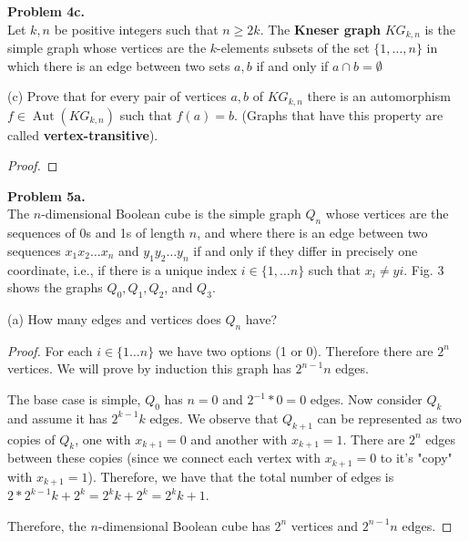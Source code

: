 \documentclass{article}
\newcommand{\set}[1]{\{#1\}}
\DeclareMathOperator*{\Aut}{Aut}
\newenvironment{hwproof}[2]
{
    \textbf{Problem #1.}\\
    #2
    \begin{proof}
}{
    \end{proof}
    \newpage
}
\begin{document}
\begin{hwproof}
    {4c}
    {
        Let $k, n$ be positive integers such that $n \geq 2k$. The \textbf{Kneser graph}
        $KG_{k,n}$ is the simple graph whose vertices are the $k$-elements subsets of
        the set $\set{1,\dots,n}$ in which there is an edge between two sets $a,b$
        if and only if $a\cap b = \emptyset$

        (c) Prove that for every pair of vertices $a,b$ of $KG_{k,n}$ there is an automorphism
        $f \in \Aut(KG_{k,n})$ such that $f(a) = b$. (Graphs that have this property are
        called \textbf{vertex-transitive}).
    }


\end{hwproof}

\begin{hwproof}
    {5a}
    {
        The $n$-dimensional Boolean cube is the simple graph $Q_n$ whose vertices are the
        sequences of 0s and 1s of length $n$, and where there is an edge between two sequences
        $x_1x_2\dots x_n$ and $y_1y_2\dots y_n$ if and only if they differ in precisely
        one coordinate, i.e., if there is a unique index $i \in \set{1,\dots n}$ such that
        $x_i \neq yi$. Fig. 3 shows the graphs $Q_0, Q_1, Q_2$, and $Q_3$.

        (a) How many edges and vertices does $Q_n$ have?
    }
    For each $i \in \set{1\dots n}$ we have two options (1 or 0). Therefore there are
    $2^n$ vertices. We will prove by induction this graph has $2^{n-1}n$ edges.

    The base case is simple, $Q_0$ has $n=0$ and $2^{-1}*0 = 0$ edges. Now consider $Q_k$ and
    assume it has $2^{k - 1}k$ edges. We observe that $Q_{k + 1}$ can be represented as
    two copies of $Q_k$, one with $x_{k + 1} = 0$ and another with $x_{k + 1} = 1$.
    There are $2^n$ edges between these copies (since we connect each vertex with
    $x_{k + 1} = 0$ to it's "copy" with $x_{k + 1} = 1$). Therefore, we have that
    the total number of edges is $2*2^{k-1}k + 2^k = 2^kk + 2^k = 2^k{k + 1}$.

    Therefore, the $n$-dimensional Boolean cube has $2^n$ vertices and $2^{n-1}n$ edges.
\end{hwproof}
\end{document}
